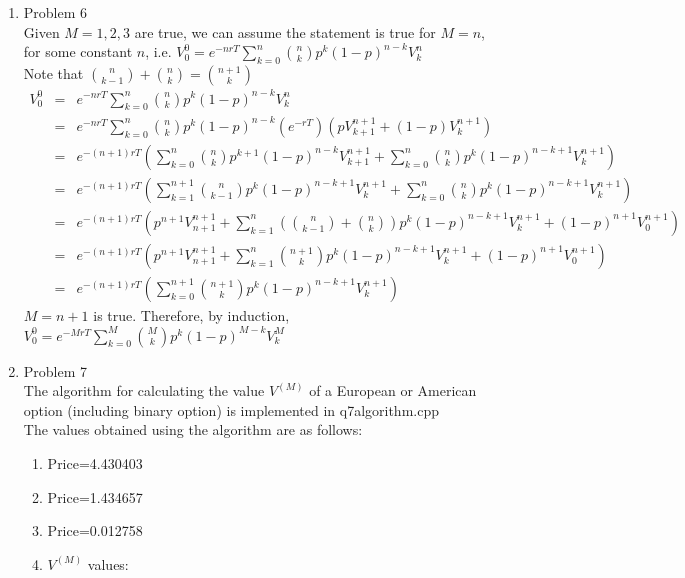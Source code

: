 \documentclass[a4paper]{article}
\def\ss{\displaystyle\sum}
\def\lb{\left(}
\def\rb{\right)}
\begin{document}
\begin{enumerate}
\item Problem 6\\
Given $M=1,2,3$ are true, we can assume the statement is true for $M=n$, for some constant $n$, i.e. $V_0^0=e^{-nrT}\ss_{k=0}^n\binom{n}{k}p^k(1-p)^{n-k}V_k^n$\\
Note that $\binom{n}{k-1}+\binom{n}{k}=\binom{n+1}{k}$
\begin{eqnarray*}
V_0^0&=&e^{-nrT}\ss_{k=0}^n\binom{n}{k}p^k(1-p)^{n-k}V_k^n\\
&=&e^{-nrT}\ss_{k=0}^n\binom{n}{k}p^k(1-p)^{n-k}(e^{-rT})(pV_{k+1}^{n+1}+(1-p)V_{k}^{n+1})\\
&=&e^{-(n+1)rT}\lb\ss_{k=0}^n\binom{n}{k}p^{k+1}(1-p)^{n-k}V_{k+1}^{n+1}+\ss_{k=0}^n\binom{n}{k}p^k(1-p)^{n-k+1}V_{k}^{n+1}\rb\\
&=&e^{-(n+1)rT}\lb\ss_{k=1}^{n+1}\binom{n}{k-1}p^k(1-p)^{n-k+1}V_{k}^{n+1}+\ss_{k=0}^n\binom{n}{k}p^k(1-p)^{n-k+1}V_{k}^{n+1}\rb\\
&=&e^{-(n+1)rT}\lb p^{n+1}V_{n+1}^{n+1}+\ss_{k=1}^{n}\lb\binom{n}{k-1}+\binom{n}{k}\rb p^k(1-p)^{n-k+1}V_{k}^{n+1}+(1-p)^{n+1}V_0^{n+1}\rb\\
&=&e^{-(n+1)rT}\lb p^{n+1}V_{n+1}^{n+1}+\ss_{k=1}^{n}\binom{n+1}{k}p^k(1-p)^{n-k+1}V_{k}^{n+1}+(1-p)^{n+1}V_0^{n+1}\rb\\
&=&e^{-(n+1)rT}\lb \ss_{k=0}^{n+1}\binom{n+1}{k}p^k(1-p)^{n-k+1}V_{k}^{n+1}\rb
\end{eqnarray*}
$M=n+1$ is true. Therefore, by induction, $V_0^0=e^{-MrT}\ss_{k=0}^{M}\binom{M}{k}p^k(1-p)^{M-k}V_k^M$

\pagebreak

\item Problem 7\\
The algorithm for calculating the value $V^{(M)}$ of a European or American option (including binary option) is implemented in q7algorithm.cpp\\
The values obtained using the algorithm are as follows:\\
\begin{enumerate}
\item Price=4.430403\\
\item Price=1.434657\\
\item Price=0.012758\\
\item $V^{(M)}$ values:


\end{enumerate}
\end{enumerate}
\end{document}

